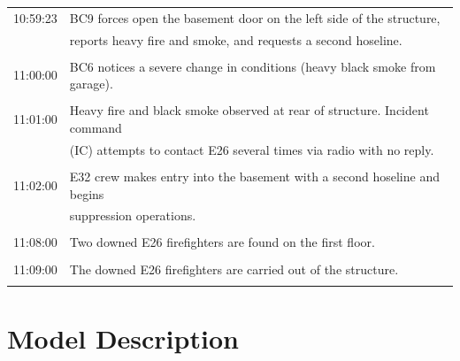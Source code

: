 \documentclass[12pt,oneside]{book}
\begin{document}
\begin{table}[!ht]
\begin{tabular}{cl}
10:59:23       &  BC9 forces open the basement door on the left side of the structure,                \\
               &  reports heavy fire and smoke, and requests a second hoseline.                       \\
               &                                                                                      \\
11:00:00       &  BC6 notices a severe change in conditions (heavy black smoke from garage).          \\
               &                                                                                      \\
11:01:00       &  Heavy fire and black smoke observed at rear of structure. Incident command          \\
               &  (IC) attempts to contact E26 several times via radio with no reply.                 \\
               &                                                                                      \\
11:02:00       &  E32 crew makes entry into the basement with a second hoseline and begins            \\
               &  suppression operations.                                                             \\
               &                                                                                      \\
11:08:00       &  Two downed E26 firefighters are found on the first floor.                           \\
               &                                                                                      \\
11:09:00       &  The downed E26 firefighters are carried out of the structure.                       \\
               &                                                                                      \\
\bottomrule
\end{tabular}
\label{tab:incident_timeline}
\end{table}
 

\chapter{Model Description}
\label{sec:model_description}
\end{document}
